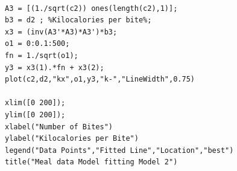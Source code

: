\documentclass{article}
\begin{document}
\begin{lstlisting}[frame=single]
% Second model %

A3 = [(1./sqrt(c2)) ones(length(c2),1)];
b3 = d2 ; %Kilocalories per bite%;
x3 = (inv(A3'*A3)*A3')*b3;
o1 = 0:0.1:500;
fn = 1./sqrt(o1);
y3 = x3(1).*fn + x3(2);
plot(c2,d2,"kx",o1,y3,"k-","LineWidth",0.75)

xlim([0 200]);
ylim([0 200]);
xlabel("Number of Bites")
ylabel("Kilocalories per Bite")
legend("Data Points","Fitted Line","Location","best")
title("Meal data Model fitting Model 2")
\end{lstlisting}
\end{document}
